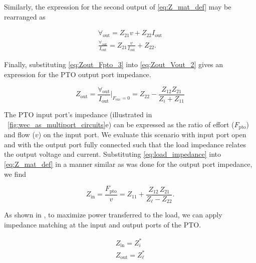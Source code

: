 \documentclass[lettersize,journal]{IEEEtran}
\begin{document}
\noindent{}Similarly, the expression for the second output of \eqref{eq:Z_mat_def} may be rearranged as

\begin{subequations}
        \begin{align}
                \forall_{\textrm{out}} = Z_{21} v + Z_{22} I_{\textrm{out}} \label{eq:Zout_Vout_1} \\[0.5em]
                \frac{\forall_{\textrm{out}}}{I_{\textrm{out}}} = Z_{21} \frac{v}{I_{\textrm{out}}} + Z_{22} . \label{eq:Zout_Vout_2}
        \end{align} 
        \label{eq:Zout_Vout}
\end{subequations}

\noindent{}Finally, substituting \eqref{eq:Zout_Fpto_3} into \eqref{eq:Zout_Vout_2} gives an expression for the PTO output port impedance.

\begin{equation}
        Z_{\textrm{out}} = \frac{\forall_{\textrm{out}}}{I_{\textrm{out}}} \bigg\vert_{F_{\textrm{exc}}=0} = Z_{22} - \frac{Z_{12} Z_{21}}{Z_{i} + Z_{11}}
        \label{eq:pto_output_port_impedance}
\end{equation}

The PTO input port's impedance (illustrated in \figurename~\ref{fig:wec_as_multiport_circuits}e) can be expressed as the ratio of effort ($F_{\textrm{pto}}$) and flow ($v$) on the input port.
We evaluate this scenario with input port open and with the output port fully connected such that the load impedance relates the output voltage and current.
Substituting \eqref{eq:load_impedance} into \eqref{eq:Z_mat_def} in a manner similar as was done for the output port impedance, we find

\begin{equation}
        Z_{\textrm{in}} = \frac{F_{\textrm{pto}}}{v}=  Z_{11} + \frac{Z_{12} \, Z_{21}}{Z_\ell - Z_{22}} .
        \label{eq:pto_input_port_impedance}
\end{equation}

As shown in  \cite{Bacelli:2021aa}, to maximize power transferred to the load, we can apply impedance matching at the input and output ports of the PTO.

\begin{subequations}
    \begin{align}
        Z_{\textrm{in}} = Z_i^*  \label{eq:bi_conj_matching_in} \\ 
        Z_{\textrm{out}} = Z_\ell^* \label{eq:bi_conj_matching_out}
    \end{align}
\label{eq:bi_conj_matching}
\end{subequations}
\end{document}
